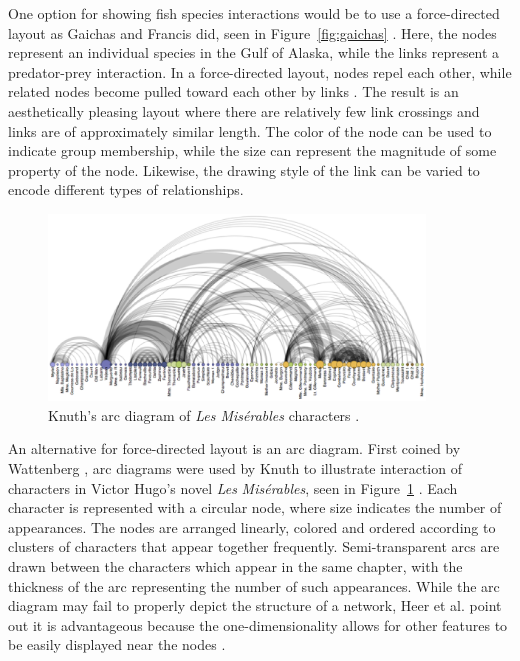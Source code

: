 One option for showing fish species interactions would be to use a force-directed layout as Gaichas and Francis did, seen in Figure~\ref{fig:gaichas} \cite{gaichas2008}.  Here, the nodes represent an individual species in the Gulf of Alaska, while the links represent a predator-prey interaction.  In a force-directed layout, nodes repel each other, while related nodes become pulled toward each other by links \cite{heer2010}.  The result is an aesthetically pleasing layout where there are relatively few link crossings and links are of approximately similar length.  The color of the node can be used to indicate group membership, while the size can represent the magnitude of some property of the node.  Likewise, the drawing style of the link can be varied to encode different types of relationships. 

\begin{figure}[h]
	\centering
	\includegraphics[width=10cm]{figures/eps/arcdiagram.eps}
	\caption{Knuth's arc diagram of \textit{Les Mis\'erables} characters \cite{knuth1993}.}
	\label{fig:arcdiagram}
\end{figure}

An alternative for force-directed layout is an arc diagram.  First coined by Wattenberg \cite{wattenberg2002}, arc diagrams were used by Knuth to illustrate interaction of characters in Victor Hugo's novel \textit{Les} \textit{Mis\'erables}, seen in Figure~\ref{fig:arcdiagram} \cite{knuth1993}.  Each character is represented with a circular node, where size indicates the number of appearances.  The nodes are arranged linearly, colored and ordered according to clusters of characters that appear together frequently.  Semi-transparent arcs are drawn between the characters which appear in the same chapter, with the thickness of the arc representing the number of such appearances.  While the arc diagram may fail to properly depict the structure of a network, Heer et al. point out it is advantageous because the one-dimensionality allows for other features to be easily displayed near the nodes \cite{heer2010}.  %

